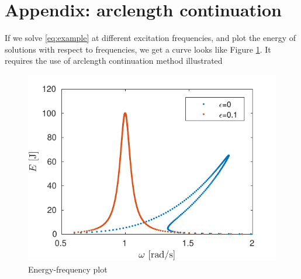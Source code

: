 \documentclass[10pt,letterpaper]{article}
\begin{document}
\section{Appendix: arclength continuation}\label{se:arclength_continuation}
If we solve \eqref{eq:example} at different excitation frequencies, and plot the energy of solutions with respect to frequencies, we get a curve looks like Figure \ref{continuation}. It requires the use of arclength continuation method illustrated 
\begin{figure}[ht!]
\centering
\includegraphics[scale=.75]{figure/continuation}
\caption{Energy-frequency plot}
\label{continuation}
\end{figure}
\end{document}
